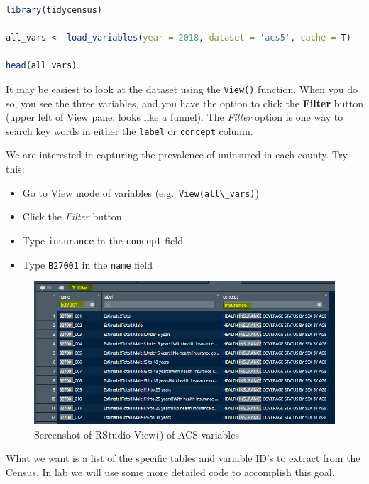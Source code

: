 \documentclass[
]{book}
\newcommand{\passthrough}[1]{#1}
\providecommand{\tightlist}{%
  \setlength{\itemsep}{0pt}\setlength{\parskip}{0pt}}
\begin{document}
\begin{lstlisting}[language=R]
library(tidycensus)

all_vars <- load_variables(year = 2018, dataset = 'acs5', cache = T)

head(all_vars)
\end{lstlisting}

It may be easiest to look at the dataset using the \passthrough{\lstinline!View()!} function. When you do so, you see the three variables, and you have the option to click the \textbf{Filter} button (upper left of View pane; looks like a funnel). The \emph{Filter} option is one way to search key words in either the \passthrough{\lstinline!label!} or \passthrough{\lstinline!concept!} column.

We are interested in capturing the prevalence of uninsured in each county. Try this:

\begin{itemize}
\tightlist
\item
  Go to View mode of variables (e.g.~\passthrough{\lstinline!View(all\_vars)!})
\item
  Click the \emph{Filter} button
\item
  Type \passthrough{\lstinline!insurance!} in the \passthrough{\lstinline!concept!} field
\item
  Type \passthrough{\lstinline!B27001!} in the \passthrough{\lstinline!name!} field
\end{itemize}

\begin{figure}
\centering
\includegraphics{images/acs-var-view.PNG}
\caption{\label{fig:unnamed-chunk-43}Screenshot of RStudio View() of ACS variables}
\end{figure}

What we want is a list of the specific tables and variable ID's to extract from the Census. In lab we will use some more detailed code to accomplish this goal.
\end{document}
